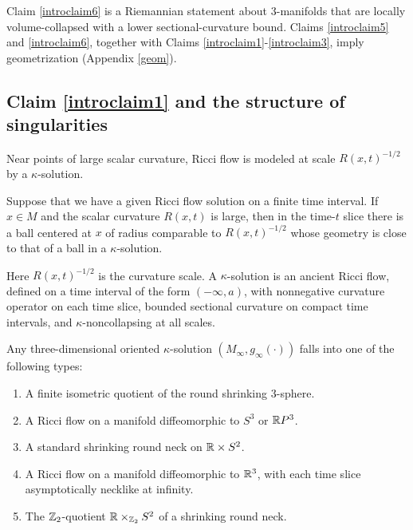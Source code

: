 Claim \ref{introclaim6} is a Riemannian statement about $3$-manifolds that
are locally volume-collapsed with a lower sectional-curvature bound.  Claims
\ref{introclaim5} and \ref{introclaim6}, together with Claims
\ref{introclaim1}-\ref{introclaim3}, imply geometrization (Appendix
\ref{geom}).

\subsection{Claim \ref{introclaim1} and the structure of singularities}

Near points of large scalar curvature, Ricci flow is modeled at scale
$R(x,t)^{-1/2}$ by a $\kappa$-solution.

\begin{proposition}
  \label{prop:kl-overview-ricci-flow-approach-manifold-geometrization-existence-kappa-solutions}
\label{introclaim7}
Suppose that we have a given Ricci flow solution on a finite time interval.
If $x\in M$ and the scalar curvature $R(x,t)$ is large, then in the time-$t$
slice there is a ball centered at $x$ of radius comparable to
$R(x,t)^{-1/2}$ whose geometry is close to that of a ball in a
$\kappa$-solution.
\end{proposition}

Here $R(x,t)^{-1/2}$ is the curvature scale.  A $\kappa$-solution is an
ancient Ricci flow, defined on a time interval of the form $(-\infty,a)$,
with nonnegative curvature operator on each time slice,
bounded sectional curvature on compact time intervals, and
$\kappa$-noncollapsing at all scales.

\begin{proposition}
  \label{prop:kl-overview-ricci-flow-approach-manifold-geometrization-rigidity-kappa-solutions}
 \cite{Perelman2} \label{introclaim8}
Any three-dimensional oriented $\kappa$-solution $(M_\infty,g_\infty(\cdot))$
falls into one of the following types:
\begin{enumerate}
\item A finite isometric quotient of the round shrinking $3$-sphere.
\item A Ricci flow on a manifold diffeomorphic to $S^3$ or ${\mathbb R} P^3$.
\item A standard shrinking round neck on ${\mathbb R}\times S^2$.
\item A Ricci flow on a manifold diffeomorphic to ${\mathbb R}^3$, with each time
slice asymptotically necklike at infinity.
\item The ${\mathbb Z}_2$-quotient ${\mathbb R}\times_{{\mathbb Z}_2}S^2$ of a shrinking round neck.
\end{enumerate}
\end{proposition}

